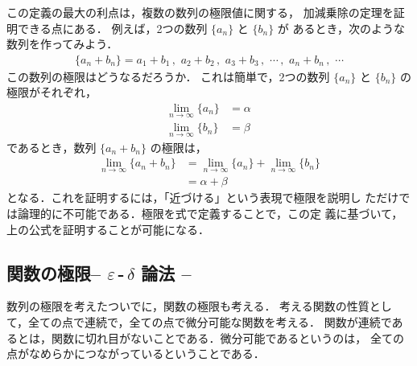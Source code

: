                 この定義の最大の利点は，複数の数列の極限値に関する，
                加減乗除の定理を証明できる点にある．
                例えば，2つの数列 $\{ a_{n} \}$ と $\{ b_{n} \}$ が
                あるとき，次のような数列を作ってみよう．
                    \begin{align*}
                        \{ a_{n}+b_{n} \} =
                            a_{1}+b_{1}\,,\,\,a_{2}+b_{2}\,,
                            \,\,a_{3}+b_{3}\,,
                            \,\,\cdots\,,
                            \,\,a_{n}+b_{n}\,,\,\,\cdots
                    \end{align*}
                この数列の極限はどうなるだろうか．
                これは簡単で，2つの数列 $\{ a_{n} \}$ と $\{ b_{n} \}$ の極限がそれぞれ，
                    \begin{align*}
                        \lim_{n\rightarrow \infty } \{ a_{n} \}
                            &= \alpha\, \\
                        \lim_{n \rightarrow \infty } \{ b_{n} \}
                            &= \beta
                    \end{align*}
                であるとき，数列 $\{ a_{n}+b_{n} \}$ の極限は，
                    \begin{align*}
                        \lim_{n\rightarrow \infty } \{ a_{n}+b_{n} \}
                        &= \lim_{n\rightarrow \infty } \{ a_{n} \}
                        +  \lim_{n\rightarrow \infty } \{ b_{n} \} \\
                        &= \alpha + \beta
                    \end{align*}
                となる．これを証明するには，「近づける」という表現で極限を説明し
                ただけでは論理的に不可能である．極限を式で定義することで，この定
                義に基づいて，上の公式を証明することが可能になる．


                \subsection{関数の極限\;\;-- $\varepsilon $\,-\,$\delta$ 論法 --}
                数列の極限を考えたついでに，関数の極限も考える．
                考える関数の性質として，全ての点で連続で，全ての点で微分可能な関数を考える．
                関数が連続であるとは，関数に切れ目がないことである．微分可能であるというのは，
                全ての点がなめらかにつながっているということである．

